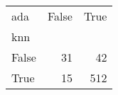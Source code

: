 \begin{tabular}{lrr}
\toprule
ada &  False &  True  \\
knn   &        &        \\
\midrule
False &     31 &     42 \\
True  &     15 &    512 \\
\bottomrule
\end{tabular}
